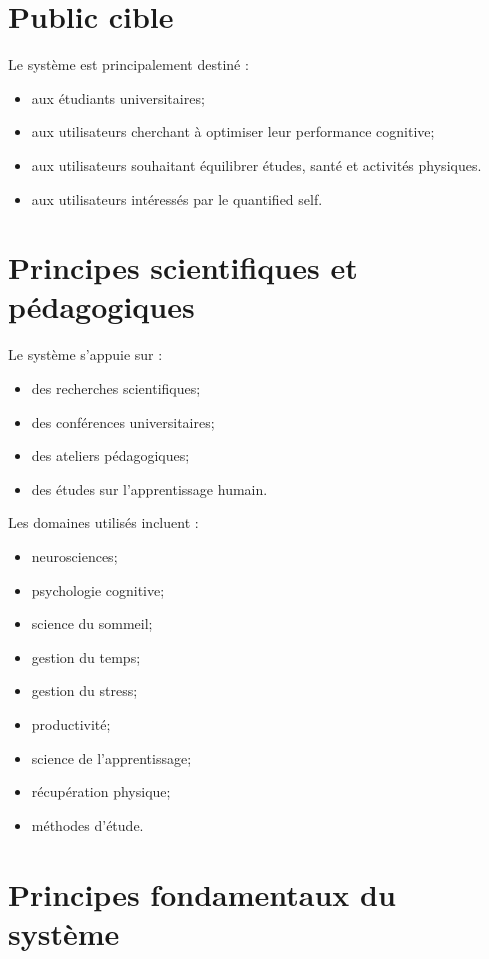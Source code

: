 \documentclass[12pt]{article}
\begin{document}
\section{Public cible}

Le système est principalement destiné :
\begin{itemize}
    \item aux étudiants universitaires;
    \item aux utilisateurs cherchant à optimiser leur performance cognitive;
    \item aux utilisateurs souhaitant équilibrer études, santé et activités physiques.
    \item aux utilisateurs intéressés par le quantified self.
\end{itemize}

\section{Principes scientifiques et pédagogiques}

Le système s’appuie sur :
\begin{itemize}
    \item des recherches scientifiques;
    \item des conférences universitaires;
    \item des ateliers pédagogiques;
    \item des études sur l’apprentissage humain.
\end{itemize}

Les domaines utilisés incluent :
\begin{itemize}
    \item neurosciences;
    \item psychologie cognitive;
    \item science du sommeil;
    \item gestion du temps;
    \item gestion du stress;
    \item productivité;
    \item science de l’apprentissage;
    \item récupération physique;
    \item méthodes d’étude.
\end{itemize}

\section{Principes fondamentaux du système}
\end{document}
